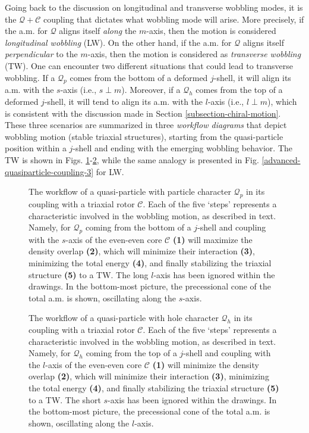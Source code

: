 Going back to the discussion on longitudinal and transverse wobbling modes, it is the $\mathcal{Q}+\mathscr{C}$ coupling that dictates what wobbling mode will arise. More precisely, if the a.m. for $\mathcal{Q}$ aligns itself \emph{along} the $m$-axis, then the motion is considered \emph{longitudinal wobbling} (LW). On the other hand, if the a.m. for $\mathcal{Q}$ aligns itself \emph{perpendicular} to the $m$-axis, then the motion is considered as \emph{transverse wobbling} (TW). One can encounter two different situations that could lead to transverse wobbling. If a $\mathcal{Q}_p$ comes from the bottom of a deformed $j$-shell, it will align its a.m. with the $s$-axis (i.e., $s\perp m$). Moreover, if a $\mathcal{Q}_h$ comes from the top of a deformed $j$-shell, it will tend to align its a.m. with the $l$-axis (i.e., $l\perp m$), which is consistent with the discussion made in Section \ref{subsection-chiral-motion}. These three scenarios are summarized in three \emph{workflow diagrams} that depict wobbling motion (stable triaxial structures), starting from the quasi-particle position within a $j$-shell and ending with the emerging wobbling behavior. The TW is shown in Figs. \ref{advanced-quasiparticle-coupling-1}-\ref{advanced-quasiparticle-coupling-2}, while the same analogy is presented in Fig. \ref{advanced-quasiparticle-coupling-3} for LW.
\begin{figure}
    \centering
    
    \caption{The workflow of a quasi-particle with particle character $\mathcal{Q}_p$ in its coupling with a triaxial rotor $\mathscr{C}$. Each of the five `steps' represents a characteristic involved in the wobbling motion, as described in text. Namely, for $\mathcal{Q}_p$ coming from the bottom of a $j$-shell and coupling with the $s$-axis of the even-even core $\mathscr{C}$ \textbf{(1)} will maximize the density overlap \textbf{(2)}, which will minimize their interaction \textbf{(3)}, minimizing the total energy \textbf{(4)}, and finally stabilizing the triaxial structure \textbf{(5)} to a TW. The long $l$-axis has been ignored within the drawings. In the bottom-most picture, the precessional cone of the total a.m. is shown, oscillating along the $s$-axis.}
    \label{advanced-quasiparticle-coupling-1}
\end{figure}
\begin{figure}
    \centering
    
    \caption{The workflow of a quasi-particle with hole character $\mathcal{Q}_h$ in its coupling with a triaxial rotor $\mathscr{C}$. Each of the five `steps' represents a characteristic involved in the wobbling motion, as described in text. Namely, for $\mathcal{Q}_h$ coming from the top of a $j$-shell and coupling with the $l$-axis of the even-even core $\mathscr{C}$ \textbf{(1)} will minimize the density overlap \textbf{(2)}, which will minimize their interaction \textbf{(3)}, minimizing the total energy \textbf{(4)}, and finally stabilizing the triaxial structure \textbf{(5)} to a TW. The short $s$-axis has been ignored within the drawings. In the bottom-most picture, the precessional cone of the total a.m. is shown, oscillating along the $l$-axis.}
    \label{advanced-quasiparticle-coupling-2}
\end{figure}
